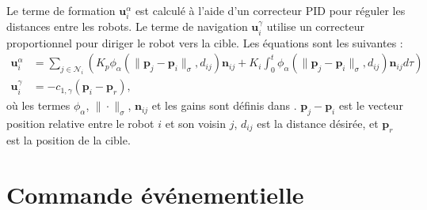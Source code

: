 Le terme de formation $\mathbf{u}_i^{\alpha}$ est calculé à l'aide d'un correcteur PID pour réguler les distances entre les robots. Le terme de navigation $\mathbf{u}_i^{\gamma}$ utilise un correcteur proportionnel pour diriger le robot vers la cible. Les équations sont les suivantes :
\begin{align}
    \mathbf{u}_i^{\alpha} &= \sum_{j \in \mathcal{N}_i} \left( K_p \phi_{\alpha}(\| \mathbf{p}_j - \mathbf{p}_i \|_{\sigma}, d_{ij}) \mathbf{n}_{ij} + K_i \int_0^t \phi_{\alpha}(\| \mathbf{p}_j - \mathbf{p}_i \|_{\sigma}, d_{ij}) \mathbf{n}_{ij} d\tau \right) \\
    \mathbf{u}_i^{\gamma} &= -c_{1, \gamma}(\mathbf{p}_i - \mathbf{p}_r),
\end{align}
où les termes $\phi_{\alpha}$, $\| \cdot \|_{\sigma}$, $\mathbf{n}_{ij}$ et les gains sont définis dans \cite{koung_consensus-based_2020}. $\mathbf{p}_j - \mathbf{p}_i$ est le vecteur position relative entre le robot $i$ et son voisin $j$, $d_{ij}$ est la distance désirée, et $\mathbf{p}_r$ est la position de la cible.

\section{Commande événementielle}





%

